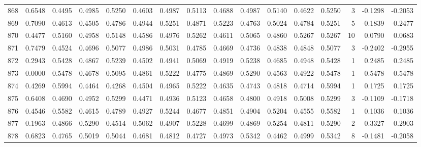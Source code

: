 \begin{tabular}{lrrrrrrrrrrrrrrr}
868 &      0.6548 &  0.4495 &  0.4985 &  0.5250 &  0.4603 &  0.4987 &  0.5113 &  0.4688 &  0.4987 &  0.5140 &   0.4622 &     0.5250 &      3 &                   -0.1298 &                    -0.2053 \\
869 &      0.7090 &  0.4613 &  0.4505 &  0.4786 &  0.4944 &  0.5251 &  0.4871 &  0.5223 &  0.4763 &  0.5024 &   0.4784 &     0.5251 &      5 &                   -0.1839 &                    -0.2477 \\
870 &      0.4477 &  0.5160 &  0.4958 &  0.5148 &  0.4586 &  0.4976 &  0.5262 &  0.4611 &  0.5065 &  0.4860 &   0.5267 &     0.5267 &     10 &                    0.0790 &                     0.0683 \\
871 &      0.7479 &  0.4524 &  0.4696 &  0.5077 &  0.4986 &  0.5031 &  0.4785 &  0.4669 &  0.4736 &  0.4838 &   0.4848 &     0.5077 &      3 &                   -0.2402 &                    -0.2955 \\
872 &      0.2943 &  0.5428 &  0.4867 &  0.5239 &  0.4502 &  0.4941 &  0.5069 &  0.4919 &  0.5238 &  0.4685 &   0.4948 &     0.5428 &      1 &                    0.2485 &                     0.2485 \\
873 &      0.0000 &  0.5478 &  0.4678 &  0.5095 &  0.4861 &  0.5222 &  0.4775 &  0.4869 &  0.5290 &  0.4563 &   0.4922 &     0.5478 &      1 &                    0.5478 &                     0.5478 \\
874 &      0.4269 &  0.5994 &  0.4464 &  0.4268 &  0.4504 &  0.4965 &  0.5222 &  0.4635 &  0.4743 &  0.4818 &   0.4714 &     0.5994 &      1 &                    0.1725 &                     0.1725 \\
875 &      0.6408 &  0.4690 &  0.4952 &  0.5299 &  0.4471 &  0.4936 &  0.5123 &  0.4658 &  0.4800 &  0.4918 &   0.5008 &     0.5299 &      3 &                   -0.1109 &                    -0.1718 \\
876 &      0.4546 &  0.5582 &  0.4615 &  0.4789 &  0.4927 &  0.5244 &  0.4677 &  0.4851 &  0.4904 &  0.5204 &   0.4555 &     0.5582 &      1 &                    0.1036 &                     0.1036 \\
877 &      0.1963 &  0.4866 &  0.5290 &  0.4514 &  0.5062 &  0.4907 &  0.5228 &  0.4699 &  0.4869 &  0.5254 &   0.4811 &     0.5290 &      2 &                    0.3327 &                     0.2903 \\
878 &      0.6823 &  0.4765 &  0.5019 &  0.5044 &  0.4681 &  0.4812 &  0.4727 &  0.4973 &  0.5342 &  0.4462 &   0.4999 &     0.5342 &      8 &                   -0.1481 &                    -0.2058 \\

\end{tabular}
